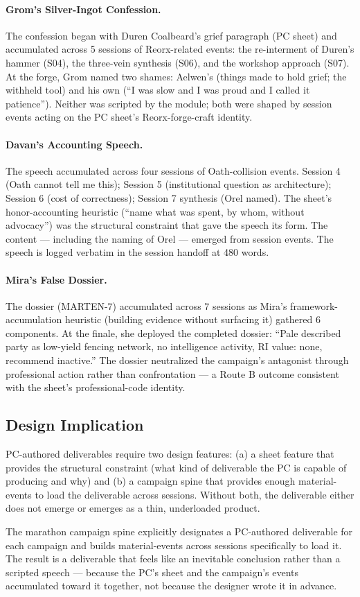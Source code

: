 \paragraph{Grom's Silver-Ingot Confession.}
The confession began with Duren Coalbeard's grief paragraph (PC sheet) and accumulated
across 5 sessions of Reorx-related events: the re-interment of Duren's hammer (S04),
the three-vein synthesis (S06), and the workshop approach (S07). At the forge, Grom
named two shames: Aelwen's (things made to hold grief; the withheld tool) and his own
(``I was slow and I was proud and I called it patience''). Neither was scripted by the
module; both were shaped by session events acting on the PC sheet's Reorx-forge-craft
identity.

\paragraph{Davan's Accounting Speech.}
The speech accumulated across four sessions of Oath-collision events. Session 4 (Oath
cannot tell me this); Session 5 (institutional question as architecture); Session 6
(cost of correctness); Session 7 synthesis (Orel named). The sheet's honor-accounting
heuristic (``name what was spent, by whom, without advocacy'') was the structural
constraint that gave the speech its form. The content --- including the naming of
Orel --- emerged from session events. The speech is logged verbatim in the session
handoff at 480 words.

\paragraph{Mira's False Dossier.}
The dossier (MARTEN-7) accumulated across 7 sessions as Mira's framework-accumulation
heuristic (building evidence without surfacing it) gathered 6 components. At the finale,
she deployed the completed dossier: ``Pale described party as low-yield fencing network,
no intelligence activity, RI value: none, recommend inactive.'' The dossier neutralized
the campaign's antagonist through professional action rather than confrontation --- a
Route B outcome consistent with the sheet's professional-code identity.

\subsection{Design Implication}

PC-authored deliverables require two design features: (a) a sheet feature that provides
the structural constraint (what kind of deliverable the PC is capable of producing and
why) and (b) a campaign spine that provides enough material-events to load the
deliverable across sessions. Without both, the deliverable either does not emerge or
emerges as a thin, underloaded product.

The marathon campaign spine explicitly designates a PC-authored deliverable for each
campaign and builds material-events across sessions specifically to load it. The result
is a deliverable that feels like an inevitable conclusion rather than a scripted speech ---
because the PC's sheet and the campaign's events accumulated toward it together, not
because the designer wrote it in advance.
